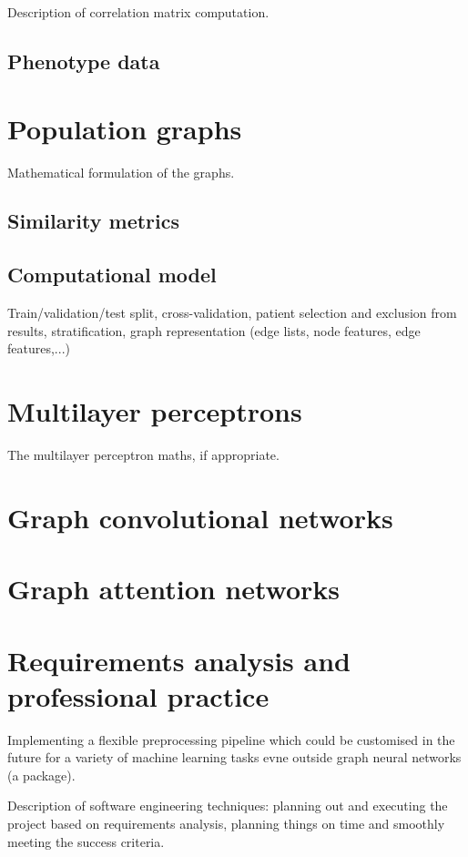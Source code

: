 \documentclass[12pt,a4paper,twoside, openright, hidelinks]{report}
\begin{document}
Description of correlation matrix computation.

\subsection{Phenotype data}

\section{Population graphs}
Mathematical formulation of the graphs.

\subsection{Similarity metrics}

\subsection{Computational model}
Train/validation/test split, cross-validation, patient selection and exclusion from results, stratification, graph representation (edge lists, node features, edge features,...)

\section{Multilayer perceptrons}
The multilayer perceptron maths, if appropriate.

\section{Graph convolutional networks}

\section{Graph attention networks}

\section{Requirements analysis and professional practice}

Implementing a flexible preprocessing pipeline which could be customised in the future for a variety of machine learning tasks evne outside graph neural networks (a package).

Description of software engineering techniques: planning out and executing the project based on requirements analysis, planning things on time and smoothly meeting the success criteria.
\end{document}
